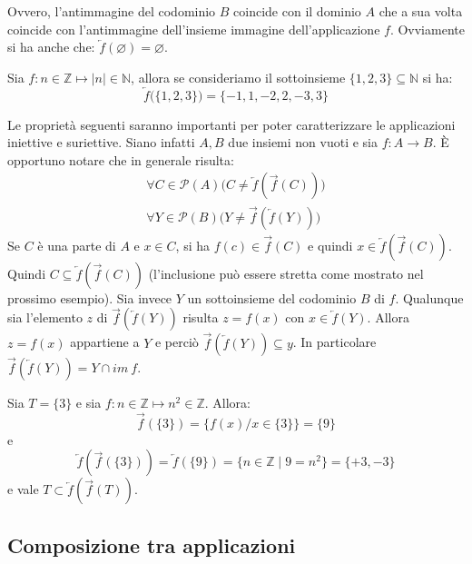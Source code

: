 Ovvero, l'antimmagine del codominio $B$ coincide con il dominio $A$ che a sua volta coincide con l'antimmagine dell'insieme immagine dell'applicazione $f$. Ovviamente si ha anche che: $\overleftarrow{f}(\varnothing) = \varnothing$.

\begin{example}
	Sia $f: n \in  \mathbb{Z} \mapsto |n| \in \mathbb{N}$, allora se consideriamo il sottoinsieme $\{1,2,3\} \subseteq \mathbb{N}$ si ha:
	\begin{displaymath}
		\overleftarrow{f} \bigl(\{1,2,3\}\bigr)=\{-1,1,-2,2,-3,3\}
	\end{displaymath}
\end{example}

Le proprietà seguenti saranno importanti per poter caratterizzare le applicazioni iniettive e suriettive. Siano infatti $A,B$ due insiemi non vuoti e sia $f: A \rightarrow B$. È opportuno notare che in generale risulta:
\begin{align*}
	\forall C \in \mathcal{P}(A) \bigl(C \neq \overleftarrow{f}(\overrightarrow{f}(C)) \bigr) \\
	\forall Y \in \mathcal{P}(B) \bigl( Y \neq \overrightarrow{f}(\overleftarrow{f}(Y))\bigr)
\end{align*}
 Se $C$ è una parte di $A$ e $x \in C$, si ha $f(c) \in \overrightarrow{f}(C)$ e quindi $x \in \overleftarrow{f}(\overrightarrow{f}(C))$. Quindi $C \subseteq \overleftarrow{f}(\overrightarrow{f}(C))$ (l'inclusione può essere stretta come mostrato nel prossimo esempio). Sia invece $Y$ un sottoinsieme del codominio $B$ di $f$. Qualunque sia l'elemento $z$ di $\overrightarrow{f}(\overleftarrow{f}(Y))$ risulta $z=f(x)$ con $x \in \overleftarrow{f}(Y)$. Allora $z = f(x)$ appartiene a $Y$ e perciò $\overrightarrow{f}(\overleftarrow{f}(Y)) \subseteq y$. In particolare $\overrightarrow{f}(\overleftarrow{f}(Y)) = Y \cap im \ f$.


\begin{example}
	Sia $T=\{3\}$ e sia $f: n \in \mathbb{Z} \mapsto n^{2} \in \mathbb{Z}$. Allora: $$\overrightarrow{f}(\{3\}) = \{f(x)/x \in \{3\}\} = \{9\}$$ e $$\overleftarrow{f}(\overrightarrow{f}(\{3\})) = \overleftarrow{f}(\{9\}) =\{n \in \mathbb{Z} \; | \; 9 = n^{2}\} = \{+3,-3\}$$ e vale $T \subset \overleftarrow{f}(\overrightarrow{f}(T))$.
\end{example}

\subsection{Composizione tra applicazioni}


